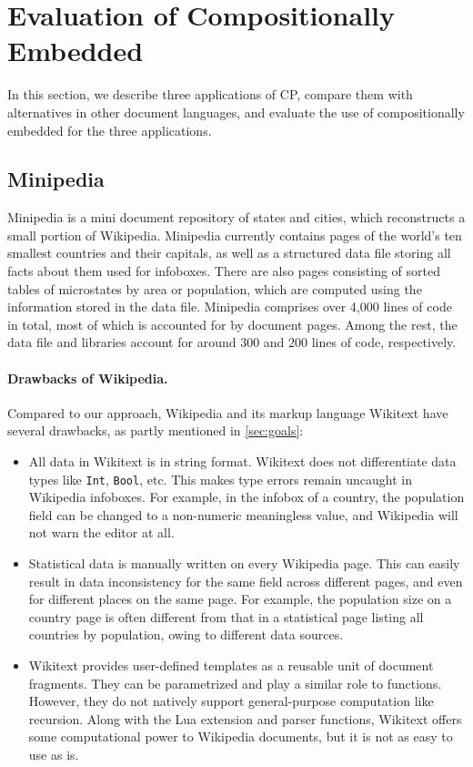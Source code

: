 \section{Evaluation of Compositionally Embedded \ExT}

In this section, we describe three applications of CP, compare them with
alternatives in other document languages, and evaluate the use of
compositionally embedded \ExT for the three applications.

\subsection{Minipedia} \label{sec:minipedia}

Minipedia is a mini document repository of states and cities, which reconstructs
a small portion of Wikipedia. Minipedia currently contains pages of the world's
ten smallest countries and their capitals, as well as a structured data file
storing all facts about them used for infoboxes. There are also pages consisting
of sorted tables of microstates by area or population, which are computed using
the information stored in the data file. Minipedia comprises over 4,000 lines of
code in total, most of which is accounted for by document pages. Among the rest,
the data file and \ExT libraries account for around 300 and 200 lines of code,
respectively.

\paragraph{Drawbacks of Wikipedia.}
Compared to our approach, Wikipedia and its markup language Wikitext have
several drawbacks, as partly mentioned in \autoref{sec:goals}:
\begin{itemize}
\item All data in Wikitext is in string format. Wikitext does not differentiate
      data types like \lstinline{Int}, \lstinline{Bool}, etc. This makes type
      errors remain uncaught in Wikipedia infoboxes. For example, in the infobox
      of a country, the population field can be changed to a non-numeric
      meaningless value, and Wikipedia will not warn the editor at all.
\item Statistical data is manually written on every Wikipedia page. This can
      easily result in data inconsistency for the same field across different
      pages, and even for different places on the same page. For example, the
      population size on a country page is often different from that in a
      statistical page listing all countries by population, owing to different
      data sources.
\item Wikitext provides user-defined templates as a reusable unit of document
      fragments. They can be parametrized and play a similar role to functions.
      However, they do not natively support general-purpose computation like
      recursion. Along with the Lua extension and parser functions, Wikitext
      offers some computational power to Wikipedia documents, but it is not as
      easy to use as \ExT is.
\end{itemize}

